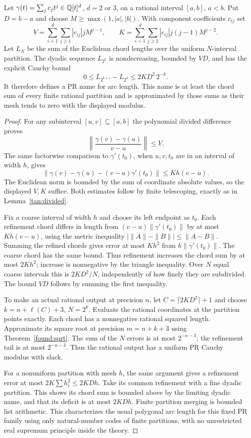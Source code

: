 \begin{theorem}
\label{tan:arclength}
Let $\gamma(t)=\sum_j c_jt^j\in\mathbb Q[t]^d$, $d=2$ or $3$, on a
rational interval $[a,b]$, $a<b$. Put $D=b-a$ and choose
$M\ge\max(1,|a|,|b|)$. With component coefficients $c_{ij}$ set
\[
 V=\sum_{i=1}^{d}\sum_{j\ge1}|c_{ij}|jM^{j-1},\qquad
 K=\sum_{i=1}^{d}\sum_{j\ge2}|c_{ij}|j(j-1)M^{j-2}.
\]
Let $L_N$ be the sum of the Euclidean chord lengths over the uniform
$N$-interval partition. The dyadic sequence $L_{2^k}$ is nondecreasing,
bounded by $VD$, and has the explicit Cauchy bound
\[
 0\le L_{2^{k+s}}-L_{2^k}\le 2KD^2\,2^{-k}.
\]
It therefore defines a PR name for arc length. This name is at least
the chord sum of every finite rational partition and is approximated by
those sums as their mesh tends to zero with the displayed modulus.
\end{theorem}
\begin{proof}
For any subinterval $[u,v]\subseteq[a,b]$ the polynomial divided
difference proves
\[
 \left\|\frac{\gamma(v)-\gamma(u)}{v-u}\right\|\le V.
\]
The same factorwise comparison to $\gamma'(t_0)$, when $u,v,t_0$
are in an interval of width $h$, gives
\[
 \|\gamma(v)-\gamma(u)-(v-u)\gamma'(t_0)\|
                  \le K h(v-u).
\]
The Euclidean norm is bounded by the sum of coordinate absolute values,
so the displayed $V,K$ suffice. Both estimates follow by finite
telescoping, exactly as in Lemma~\ref{tan:divided}.

Fix a coarse interval of width $h$ and choose its left endpoint as
$t_0$. Each refinement chord differs in length from
$(v-u)\|\gamma'(t_0)\|$ by at most $Kh(v-u)$, using the metric
inequality $|\|A\|-\|B\||\le\|A-B\|$. Summing the refined
chords gives error at most $Kh^2$ from $h\|\gamma'(t_0)\|$.
The coarse chord has the same bound. Thus refinement increases the
chord sum by at most $2Kh^2$; increase is nonnegative by the triangle
inequality. Over $N$ equal coarse intervals this is $2KD^2/N$,
independently of how finely they are subdivided. The bound $VD$ follows
by summing the first inequality.

To make an actual rational output at precision $n$, let
$C=\lceil2KD^2\rceil+1$ and choose
$k=n+\ell(C)+3$, $N=2^k$. Evaluate the rational coordinates at
the partition points exactly. Each chord has a nonnegative rational
squared length. Approximate its square root at precision
$m=n+k+3$ using Theorem~\ref{found:sqrt}. The sum of the $N$ errors
is at most $2^{-n-3}$; the refinement tail is at most $2^{-n-3}$.
Thus the rational output has a uniform PR Cauchy modulus with slack.

For a nonuniform partition with mesh $h$, the same argument gives a
refinement error at most $2K\sum h_i^2\le2KD h$. Take its common
refinement with a fine dyadic partition. This shows its chord sum is
bounded above by the limiting dyadic name, and that its deficit is
at most $2KD h$. Finite partition merging is bounded list arithmetic.
This characterizes the usual polygonal arc length for this fixed PR
family using only natural-number codes of finite partitions, with no
unrestricted real supremum principle inside the theory.
\end{proof}

